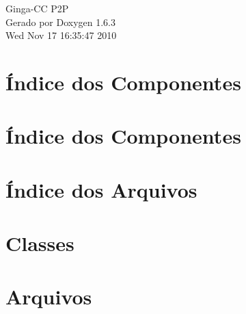 \documentclass[a4paper]{book}
\begin{document}
\begin{titlepage}
\vspace*{7cm}
\begin{center}
{\Large Ginga-\/CC P2P }\\
\vspace*{1cm}
{\large Gerado por Doxygen 1.6.3}\\
\vspace*{0.5cm}
{\small Wed Nov 17 16:35:47 2010}\\
\end{center}
\end{titlepage}
\clearemptydoublepage
{}
\tableofcontents
\clearemptydoublepage
{}
\chapter{Índice dos Componentes}

\chapter{Índice dos Componentes}

\chapter{Índice dos Arquivos}

\chapter{Classes}





\chapter{Arquivos}







\printindex
\end{document}
